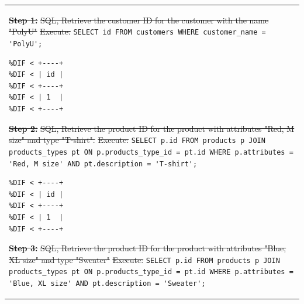 \documentclass[preprint,12pt]{elsarticle}
\providecommand{\DIFdeltex}[1]{{\protect\color{red}\sout{#1}}}                      %
\providecommand{\DIFmodbegin}{} %
\providecommand{\DIFmodend}{} %
\providecommand{\DIFdel}[1]{\texorpdfstring{\DIFdeltex{#1}}{}} %
\begin{document}
\begin{center}
\begin{longtable}{p{390pt}}
\textbf{\DIFdel{Step 1:}} %
\DIFdel{SQL, Retrieve the customer ID for the customer with the name "PolyU"}%
\DIFdel{Execute:}%
%
{\color{red}%
\lstinline!SELECT id FROM customers WHERE customer_name = 'PolyU';! %
}%
\DIFmodbegin
\begin{lstlisting}[alsolanguage=DIFcode]
%DIF < Results from executing the SQL:
%DIF < +----+
%DIF < | id |
%DIF < +----+
%DIF < | 1  |
%DIF < +----+
\end{lstlisting}
\DIFmodend %
\textbf{\DIFdel{Step 2:}} %
\DIFdel{SQL, Retrieve the product ID for the product with attributes "Red, M size" and type "T-shirt".}%
\DIFdel{Execute:}%
%
{\color{red}%
\lstinline!SELECT p.id FROM products p JOIN products_types pt ON p.products_type_id = pt.id WHERE p.attributes = 'Red, M size' AND pt.description = 'T-shirt';! %
}%
\DIFmodbegin
\begin{lstlisting}[alsolanguage=DIFcode]
%DIF < Results from executing the SQL:
%DIF < +----+
%DIF < | id |
%DIF < +----+
%DIF < | 1  |
%DIF < +----+
\end{lstlisting}
\DIFmodend %
\textbf{\DIFdel{Step 3:}} %
\DIFdel{SQL, Retrieve the product ID for the product with attributes "Blue, XL size" and type "Sweater"}%
\DIFdel{Execute:}%
%
{\color{red}%
\lstinline!SELECT p.id FROM products p JOIN products_types pt ON p.products_type_id = pt.id WHERE p.attributes = 'Blue, XL size' AND pt.description = 'Sweater';! %
}
\end{longtable}
\end{center}
\end{document}
